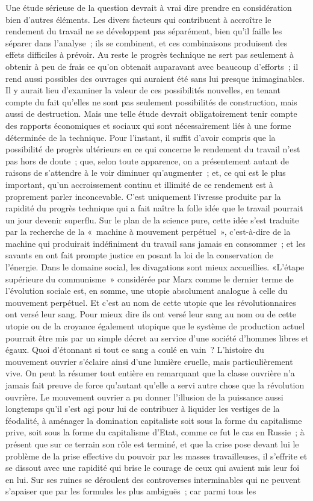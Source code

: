 \documentclass[french,twoside]{book} %
\begin{document}
Une étude sérieuse de la question devrait à vrai dire prendre en considération bien d'autres éléments. Les divers facteurs qui contribuent à accroître le rendement du travail ne se développent pas séparément, bien qu'il faille les séparer dans l'analyse ; ils se combinent, et ces combinaisons produisent des effets difficiles à prévoir. Au reste le progrès technique ne sert pas seulement à obtenir à peu de frais ce qu'on obtenait auparavant avec beaucoup d'efforts ; il rend aussi possibles des ouvrages qui auraient été sans lui presque inimaginables. Il y aurait lieu d'examiner la valeur de ces possibilités nouvelles, en tenant compte du fait qu'elles ne sont pas seulement possibilités de construction, mais aussi de destruction. Mais une telle étude devrait obligatoirement tenir compte des rapports économiques et sociaux qui sont nécessairement liés à une forme déterminée de la technique. Pour l'instant, il suffit d'avoir compris que la possibilité de progrès ultérieurs en ce qui concerne le rendement du travail n'est pas hors de doute ; que, selon toute apparence, on a présentement autant de raisons de s'attendre à le voir diminuer qu'augmenter ; et, ce qui est le plus important, qu'un accroissement continu et illimité de ce rendement est à proprement parler inconcevable. C'est uniquement l'ivresse produite par la rapidité du progrès technique qui a fait naître la folle idée que le travail pourrait un jour devenir superflu. Sur le plan de la science pure, cette idée s'est traduite par la recherche de la « machine à mouvement perpétuel », c'est-à-dire de la machine qui produirait indéfiniment du travail sans jamais en consommer ; et les savants en ont fait prompte justice en posant la loi de la conservation de l'énergie. Dans le domaine social, les divagations sont mieux accueillies. «L'étape supérieure du communisme » considérée par Marx comme le dernier terme de l'évolution sociale est, en somme, une utopie absolument analogue à celle du mouvement perpétuel. Et c'est au nom de cette utopie que les révolutionnaires ont versé leur sang. Pour mieux dire ils ont versé leur sang au nom ou de cette utopie ou de la croyance également utopique que le système de production actuel pourrait être mis par un simple décret au service d'une société d'hommes libres et égaux. Quoi d'étonnant si tout ce sang a coulé en vain ? L'histoire du mouvement ouvrier s'éclaire ainsi d'une lumière cruelle, mais particulièrement vive. On peut la résumer tout entière en remarquant que la classe ouvrière n'a jamais fait preuve de force qu'autant qu'elle a servi autre chose que la révolution ouvrière. Le mouvement ouvrier a pu donner l'illusion de la puissance aussi longtemps qu'il s'est agi pour lui de contribuer à liquider les vestiges de la féodalité, à aménager la domination capitaliste soit sous la forme du capitalisme prive, soit sous la forme du capitalisme d'Etat, comme ce fut le cas en Russie ; à présent que sur ce terrain son rôle est terminé, et que la crise pose devant lui le problème de la prise effective du pouvoir par les masses travailleuses, il s'effrite et se dissout avec une rapidité qui brise le courage de ceux qui avaient mis leur foi en lui. Sur ses ruines se déroulent des controverses interminables qui ne peuvent s'apaiser que par les formules les plus ambiguës ; car parmi tous les 
\end{document}

